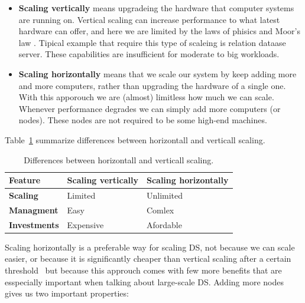 \begin{itemize}
	\item \textbf{Scaling vertically} means upgradeing the hardware that computer systems are running on. Vertical scaling can increase performance to what latest hardware can offer, and here we are limited by the laws of phisics and Moor's law \cite{Gustafson2011}. Tipical example that require this type of scaleing is relation dataase server. These capabilities are insufficient for moderate to big workloads.
	\item \textbf{Scaling horizontally} means that we scale our system by keep adding more and more computers, rather than upgrading the hardware of a single one. With this apporouch we are (almost) limitless how much we can scale. Whenever performance degrades we can simply add more computers (or nodes). These nodes are not required to be some high-end machines.
\end{itemize}

Table~\ref{tab:table1} summarize differences between horizontall and verticall scaling.

\begin{table}[h!]
	\begin{center}
		\begin{tabular}{l|l|l}
			\textbf{Feature} & \textbf{Scaling vertically} & \textbf{Scaling horizontally}\\
			\hline
			\textbf{Scaling} & Limited & Unlimited \\
			\textbf{Managment} & Easy & Comlex\\
			\textbf{Investments} & Expensive & Afordable \\
		\end{tabular}
	\end{center}
	\vspace{-0.5cm}
	\caption{Differences between horizontall and verticall scaling.}
	\label{tab:table1}
\end{table}

Scaling horizontally is a preferable way for scaling DS, not because we can scale easier, or because it is significantly cheaper than vertical scaling after a certain threshold~\cite{Bondi00} but because this approuch comes with few more benefits that are esspecially important when talking about large-scale DS. Adding more nodes gives us two important properties: 

